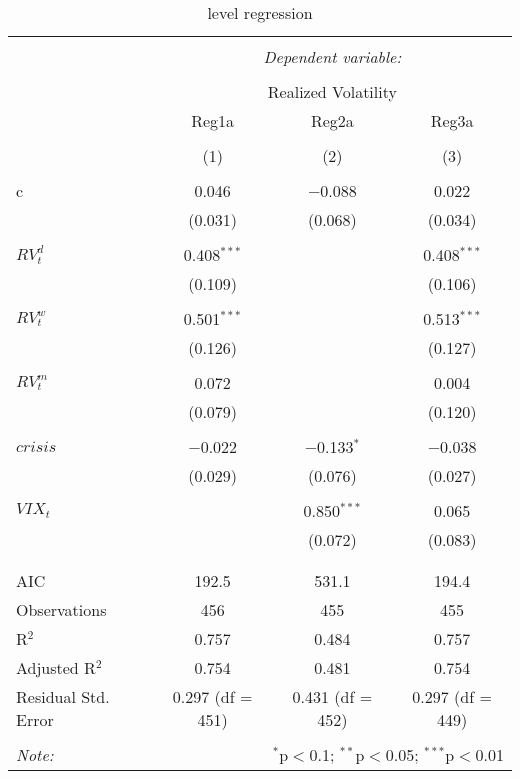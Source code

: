 
\begin{table}[!htbp] \centering 
  \caption{level regression} 
  \label{} 
\begin{tabular}{@{\extracolsep{5pt}}lccc} 
\\[-1.8ex]\hline 
\hline \\[-1.8ex] 
 & \multicolumn{3}{c}{\textit{Dependent variable:}} \\ 
\cline{2-4} 
\\[-1.8ex] & \multicolumn{3}{c}{Realized Volatility} \\ 
 & Reg1a & Reg2a & Reg3a \\ 
\\[-1.8ex] & (1) & (2) & (3)\\ 
\hline \\[-1.8ex] 
 c & 0.046 & $-$0.088 & 0.022 \\ 
  & (0.031) & (0.068) & (0.034) \\ 
  & & & \\ 
 $ RV^{d}_{t}$ & 0.408$^{***}$ &  & 0.408$^{***}$ \\ 
  & (0.109) &  & (0.106) \\ 
  & & & \\ 
 $RV^{w}_{t}$ & 0.501$^{***}$ &  & 0.513$^{***}$ \\ 
  & (0.126) &  & (0.127) \\ 
  & & & \\ 
 $RV^{m}_{t}$ & 0.072 &  & 0.004 \\ 
  & (0.079) &  & (0.120) \\ 
  & & & \\ 
 $crisis$ & $-$0.022 & $-$0.133$^{*}$ & $-$0.038 \\ 
  & (0.029) & (0.076) & (0.027) \\ 
  & & & \\ 
 $VIX_{t}$ &  & 0.850$^{***}$ & 0.065 \\ 
  &  & (0.072) & (0.083) \\ 
  & & & \\ 
\hline \\[-1.8ex] 
AIC & 192.5 & 531.1 & 194.4 \\ 
Observations & 456 & 455 & 455 \\ 
R$^{2}$ & 0.757 & 0.484 & 0.757 \\ 
Adjusted R$^{2}$ & 0.754 & 0.481 & 0.754 \\ 
Residual Std. Error & 0.297 (df = 451) & 0.431 (df = 452) & 0.297 (df = 449) \\ 
\hline 
\hline \\[-1.8ex] 
\textit{Note:}  & \multicolumn{3}{r}{$^{*}$p$<$0.1; $^{**}$p$<$0.05; $^{***}$p$<$0.01} \\ 
\end{tabular} 
\end{table} 
